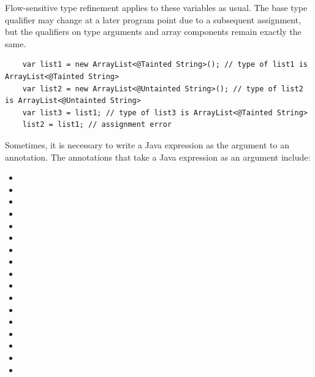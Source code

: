 Flow-sensitive type refinement applies to these variables as usual.
The base type qualifier may change at a later program point due to
a subsequent assignment, but the qualifiers on type arguments and
array components remain exactly the same.

\begin{Verbatim}
    var list1 = new ArrayList<@Tainted String>(); // type of list1 is ArrayList<@Tainted String>
    var list2 = new ArrayList<@Untainted String>(); // type of list2 is ArrayList<@Untainted String>
    var list3 = list1; // type of list3 is ArrayList<@Tainted String>
    list2 = list1; // assignment error
\end{Verbatim}


Sometimes, it is necessary to write a Java expression as the argument to an
annotation.  The annotations that take a Java
expression as an argument include:

\begin{itemize}
\item {}
\item {}
\item {}
\item {}
\item {}
\item {}
\item {}
\item {}
\item {}
\item {}
\item {}
\item {}
\item {}
\item {}
\item {}
\item {}
\item {}
\end{itemize}

